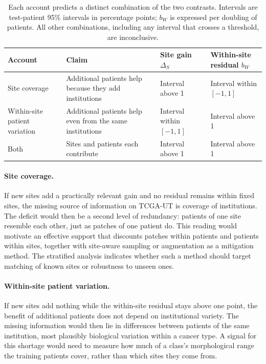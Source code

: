\documentclass[11pt]{article}
\begin{document}
\begin{table}[htbp]
\centering
\renewcommand{\arraystretch}{1.15}
\begin{tabularx}{\textwidth}{@{}lYYY@{}}
\toprule
Account & Claim & Site gain $\Delta_S$ & Within-site residual $b_W$ \\
\midrule
Site coverage & Additional patients help because they add institutions & Interval above 1 & Interval within $[-1,1]$ \\
\addlinespace
Within-site patient variation & Additional patients help even from the same institutions & Interval within $[-1,1]$ & Interval above 1 \\
\addlinespace
Both & Sites and patients each contribute & Interval above 1 & Interval above 1 \\
\bottomrule
\end{tabularx}
\caption{Each account predicts a distinct combination of the two contrasts. Intervals are test-patient 95\% intervals in percentage points; $b_W$ is expressed per doubling of patients. All other combinations, including any interval that crosses a threshold, are inconclusive.}
\label{tab:accounts}
\end{table}

\paragraph{Site coverage.}
If new sites add a practically relevant gain and no residual remains within fixed sites, the missing source of information on TCGA-UT is coverage of institutions. The deficit would then be a second level of redundancy: patients of one site resemble each other, just as patches of one patient do. This reading would motivate an effective support that discounts patches within patients and patients within sites, together with site-aware sampling or augmentation as a mitigation method. The stratified analysis indicates whether such a method should target matching of known sites or robustness to unseen ones.

\paragraph{Within-site patient variation.}
If new sites add nothing while the within-site residual stays above one point, the benefit of additional patients does not depend on institutional variety. The missing information would then lie in differences between patients of the same institution, most plausibly biological variation within a cancer type. A signal for this shortage would need to measure how much of a class's morphological range the training patients cover, rather than which sites they come from.
\end{document}
